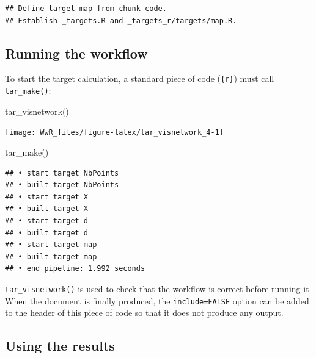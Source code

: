 \documentclass[
  12pt,
  american,
  a4paper,
  extrafontsizes,onecolumn,openright
  ]{memoir}
\newenvironment{Shaded}{\begin{snugshade}}{\end{snugshade}}
\newcommand{\FunctionTok}[1]{\textcolor[rgb]{0.00,0.00,0.00}{#1}}
\newcommand{\NormalTok}[1]{#1}
\begin{document}
\begin{verbatim}
## Define target map from chunk code.
## Establish _targets.R and _targets_r/targets/map.R.
\end{verbatim}

\normalsize

\hypertarget{running-the-workflow}{%
\subsection{Running the workflow}\label{running-the-workflow}}

To start the target calculation, a standard piece of code (\texttt{\{r\}}) must call \texttt{tar\_make()}:

\scriptsize

\begin{Shaded}
\begin{Highlighting}[]
\FunctionTok{tar\_visnetwork}\NormalTok{()}
\end{Highlighting}
\end{Shaded}

\begin{center}\texttt{[image: WwR\_files/figure-latex/tar\_visnetwork\_4-1]} \end{center}

\begin{Shaded}
\begin{Highlighting}[]
\FunctionTok{tar\_make}\NormalTok{()}
\end{Highlighting}
\end{Shaded}

\begin{verbatim}
## • start target NbPoints
## • built target NbPoints
## • start target X
## • built target X
## • start target d
## • built target d
## • start target map
## • built target map
## • end pipeline: 1.992 seconds
\end{verbatim}

\normalsize

\texttt{tar\_visnetwork()} is used to check that the workflow is correct before running it.
When the document is finally produced, the \texttt{include=FALSE} option can be added to the header of this piece of code so that it does not produce any output.

\hypertarget{using-the-results}{%
\subsection{Using the results}\label{using-the-results}}
\end{document}
